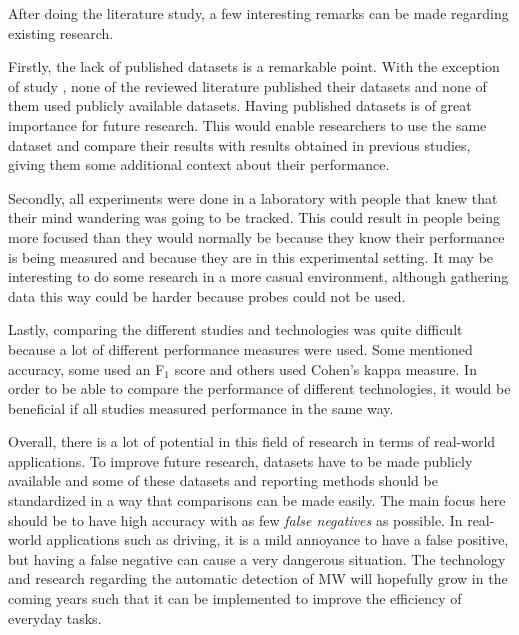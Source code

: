 After doing the literature study, a few interesting remarks can be made regarding existing research.

Firstly, the lack of published datasets is a remarkable point. With the exception of study \cite{Zhao2017ScalableApproach}, none of the reviewed literature published their datasets and none of them used publicly available datasets. Having published datasets is of great importance for future research. This would enable researchers to use the same dataset and compare their results with results obtained in previous studies, giving them some additional context about their performance.

Secondly, all experiments were done in a laboratory with people that knew that their mind wandering was going to be tracked. This could result in people being more focused than they would normally be because they know their performance is being measured and because they are in this experimental setting. It may be interesting to do some research in a more casual environment, although gathering data this way could be harder because probes could not be used.

Lastly, comparing the different studies and technologies was quite difficult because a lot of different performance measures were used. Some mentioned accuracy, some used an F$_1$ score and others used Cohen's kappa measure. In order to be able to compare the performance of different technologies, it would be beneficial if all studies measured performance in the same way.  

Overall, there is a lot of potential in this field of research in terms of real-world applications. To improve future research, datasets have to be made publicly available and some of these datasets and reporting methods should be standardized in a way that comparisons can be made easily.
The main focus here should be to have high accuracy with as few \emph{false negatives} as possible. In real-world applications such as driving, it is a mild annoyance to have a false positive, but having a false negative can cause a very dangerous situation. The technology and research regarding the automatic detection of MW will hopefully grow in the coming years such that it can be implemented to improve the efficiency of everyday tasks.